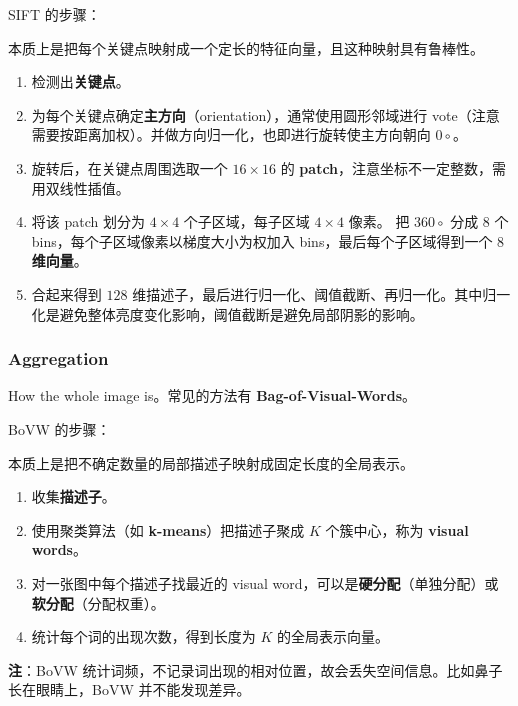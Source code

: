 SIFT 的步骤：

本质上是把每个关键点映射成一个定长的特征向量，且这种映射具有鲁棒性。

\begin{enumerate}
  \def\labelenumi{\arabic{enumi}.}
  \tightlist
  \item
        检测出\textbf{关键点}。
  \item
        为每个关键点确定\textbf{主方向}（orientation），通常使用圆形邻域进行
        vote（注意需要按距离加权）。并做方向归一化，也即进行旋转使主方向朝向
        \(0 \circ\)。
  \item
        旋转后，在关键点周围选取一个 \(16 \times 16\) 的
        \textbf{patch}，注意坐标不一定整数，需用双线性插值。
  \item
        将该 patch 划分为 \(4 \times 4\) 个子区域，每子区域 \(4 \times 4\)
        像素。 把 \(360 \circ\) 分成 \(8\) 个
        bins，每个子区域像素以梯度大小为权加入 bins，最后每个子区域得到一个
        \textbf{\(8\) 维向量}。
  \item
        合起来得到 \(128\)
        维描述子，最后进行归一化、阈值截断、再归一化。其中归一化是避免整体亮度变化影响，阈值截断是避免局部阴影的影响。
\end{enumerate}

\subsubsection{Aggregation}\label{aggregation}

How the whole image is。常见的方法有 \textbf{Bag-of-Visual-Words}。

BoVW 的步骤：

本质上是把不确定数量的局部描述子映射成固定长度的全局表示。

\begin{enumerate}
  \def\labelenumi{\arabic{enumi}.}
  \tightlist
  \item
        收集\textbf{描述子}。
  \item
        使用聚类算法（如 \textbf{k-means}）把描述子聚成 \(K\) 个簇中心，称为
        \textbf{visual words}。
  \item
        对一张图中每个描述子找最近的 visual
        word，可以是\textbf{硬分配}（单独分配）或\textbf{软分配}（分配权重）。
  \item
        统计每个词的出现次数，得到长度为 \(K\) 的全局表示向量。
\end{enumerate}

\textbf{注}：BoVW
统计词频，不记录词出现的相对位置，故会丢失空间信息。比如鼻子长在眼睛上，BoVW
并不能发现差异。


